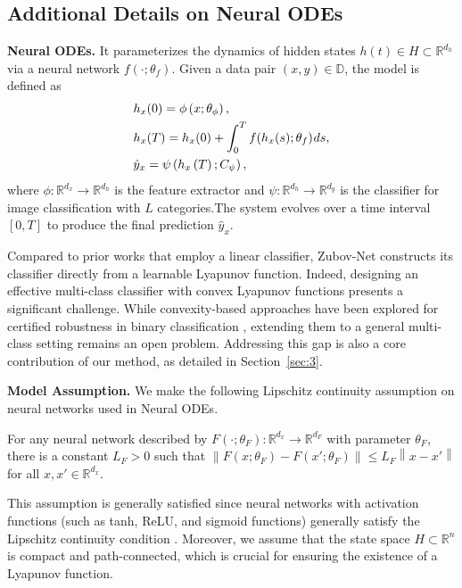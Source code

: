 \documentclass[journal]{IEEEtran}
\begin{document}
\subsection{Additional Details on Neural ODEs}
\noindent  \textbf{Neural ODEs.} It parameterizes the dynamics of hidden states $h(t) \in H \subset \mathbb{R}^{d_h}$ via a neural network $ f (\cdot;{\theta _f})$. Given a data pair $(x, y) \in \mathbb{D}$, the model is defined as
\begin{align}
	&h_{x}(0)=\phi \left( {x;{\theta _\phi }} \right),  \label{eq:2.1} \\
	&h_{x}(T) = h_x(0)+\int_0^T f (h_x(s);{\theta _f}){\mkern 1mu} ds, \label{eq:2.2}\\
	&\hat{y}_{x} = \psi \left( {h_{x}\left( T \right);{C _\psi }} \right),  \label{eq:2.3}
\end{align}
where \( \phi : \mathbb{R}^{d_x} \to \mathbb{R}^{d_h} \) is the feature extractor and \( \psi : \mathbb{R}^{d_h} \to \mathbb{R}^{d_y} \) is the classifier for image classification with $L$ categories.The system evolves over a time interval $[0, T]$ to produce the final prediction $\hat{y}_x$.

Compared to prior works that employ a linear classifier, Zubov-Net constructs its classifier directly from a learnable Lyapunov function. Indeed, designing an effective multi-class classifier with convex Lyapunov functions presents a significant challenge. While convexity-based approaches have been explored for certified robustness in binary classification \cite{NEURIPS2023_a45b205c}, extending them to a general multi-class setting remains an open problem. Addressing this gap is also a core contribution of our method, as detailed in Section~\ref{sec:3}.


\noindent  \textbf{Model Assumption.} We make the following Lipschitz continuity assumption on neural networks used in Neural ODEs.

\begin{assumption} \label{as:1}
	For any neural network described by \( F( \cdot; \theta_F) :\mathbb{R}^{d_x} \to \mathbb{R}^{d_F} \) with parameter \( \theta_F \), there is a  constant \( L_F > 0 \) such that $
		\left\| F(x; \theta_F) - F(x'; \theta_F) \right\| \leq L_F \left\| x - x' \right\| $ for all \( x, x' \in \mathbb{R}^{d_x} \).
\end{assumption}

This assumption is generally satisfied since neural networks with activation functions (such as tanh, ReLU, and sigmoid functions) generally satisfy the Lipschitz continuity condition \cite{Latorre2020Lipschitz,oh2024stable}. Moreover, we assume that the state space \( H \subset \mathbb{R}^n \) is compact and path-connected, which is crucial for ensuring the existence of a Lyapunov function.
\end{document}
